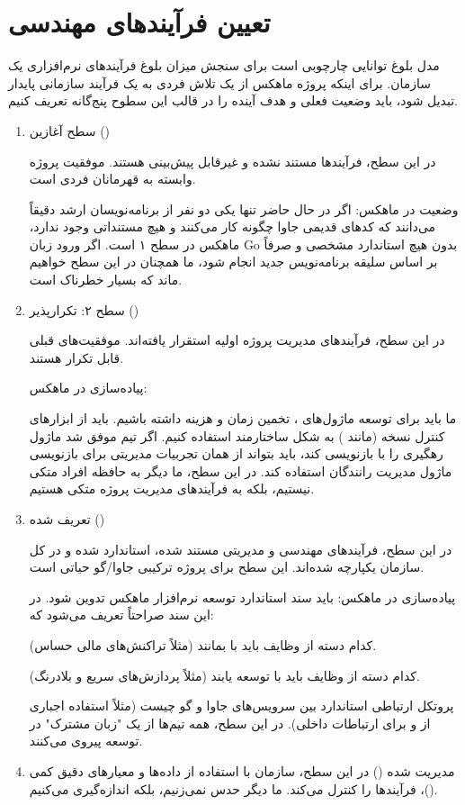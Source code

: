 \documentclass[12pt,a4paper]{report}
\begin{document}
\section{تعیین فرآیندهای مهندسی }

مدل بلوغ توانایی  چارچوبی است برای سنجش میزان بلوغ فرآیندهای نرم‌افزاری یک سازمان. برای اینکه پروژه ماهکس از یک تلاش فردی به یک فرآیند سازمانی پایدار تبدیل شود، باید وضعیت فعلی و هدف آینده را در قالب این سطوح پنج‌گانه تعریف کنیم.
\begin{enumerate}
	\item 
سطح آغازین ()

در این سطح، فرآیندها مستند نشده و غیرقابل پیش‌بینی هستند. موفقیت پروژه وابسته به قهرمانان فردی است.

وضعیت در ماهکس: اگر در حال حاضر تنها یکی دو نفر از برنامه‌نویسان ارشد دقیقاً می‌دانند که کدهای قدیمی جاوا چگونه کار می‌کنند و هیچ مستنداتی وجود ندارد، ماهکس در سطح ۱ است. اگر ورود زبان Go بدون هیچ استاندارد مشخصی و صرفاً بر اساس سلیقه برنامه‌نویس جدید انجام شود، ما همچنان در این سطح خواهیم ماند که بسیار خطرناک است.
\item 
سطح ۲: تکرارپذیر () 

در این سطح، فرآیندهای مدیریت پروژه اولیه استقرار یافته‌اند. موفقیت‌های قبلی قابل تکرار هستند.

پیاده‌سازی در ماهکس: 

ما باید برای توسعه ماژول‌های ، تخمین زمان و هزینه داشته باشیم. باید از ابزارهای کنترل نسخه (مانند ) به شکل ساختارمند استفاده کنیم. اگر تیم موفق شد ماژول رهگیری  را با بازنویسی کند، باید بتواند از همان تجربیات مدیریتی برای بازنویسی ماژول مدیریت رانندگان استفاده کند. در این سطح، ما دیگر به حافظه افراد متکی نیستیم، بلکه به فرآیندهای مدیریت پروژه متکی هستیم.
\item 
 تعریف شده () 

در این سطح، فرآیندهای مهندسی و مدیریتی مستند شده، استاندارد شده و در کل سازمان یکپارچه شده‌اند. این سطح برای پروژه ترکیبی جاوا/گو حیاتی است.


پیاده‌سازی در ماهکس: باید سند استاندارد توسعه نرم‌افزار ماهکس تدوین شود. در این سند صراحتاً تعریف می‌شود که:

کدام دسته از وظایف باید با  بمانند (مثلاً تراکنش‌های مالی حساس).

کدام دسته از وظایف باید با  توسعه یابند (مثلاً پردازش‌های سریع و بلادرنگ).

پروتکل ارتباطی استاندارد بین سرویس‌های جاوا و گو چیست (مثلاً استفاده اجباری از  و  برای ارتباطات داخلی). در این سطح، همه تیم‌ها از یک "زبان مشترک" در توسعه پیروی می‌کنند.
\item 
مدیریت شده () 
در این سطح، سازمان با استفاده از داده‌ها و معیارهای دقیق کمی ()، فرآیندها را کنترل می‌کند. ما دیگر حدس نمی‌زنیم، بلکه اندازه‌گیری می‌کنیم.


\end{enumerate}
\end{document}
